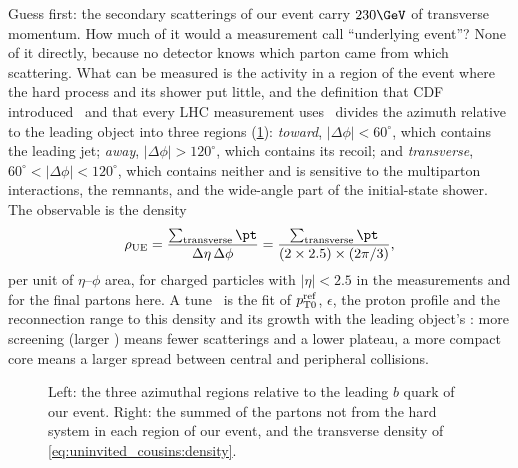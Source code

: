 Guess first: the secondary scatterings of our event carry $230\GeV$ of
transverse momentum. How much of it would a measurement call ``underlying
event''? None of it directly, because no detector knows which parton came
from which scattering. What can be measured is the activity in a region of
the event where the hard process and its shower put little, and the
definition that CDF introduced~\cite{CDF:2001onq,Field:2002vt} and that
every LHC measurement uses~\cite{ATLAS:2017blj,CMS:2017ngy} divides the
azimuth relative to the leading object into three regions
(\cref{fig:uninvited_cousins:ue_sketch}): \emph{toward}, $|\Delta\phi|<60^\circ$,
which contains the leading jet; \emph{away}, $|\Delta\phi|>120^\circ$, which
contains its recoil; and \emph{transverse}, $60^\circ<|\Delta\phi|<120^\circ$,
which contains neither and is sensitive to the multiparton interactions,
the remnants, and the wide-angle part of the initial-state shower. The
observable is the density
\begin{equation}
  \rho_{\mathrm{UE}}=\frac{\sum_{\mathrm{transverse}}\pt}{\Delta\eta\,\Delta\phi}
  =\frac{\sum_{\mathrm{transverse}}\pt}{(2\times2.5)\times(2\pi/3)},
  \label{eq:uninvited_cousins:density}
\end{equation}
per unit of $\eta$--$\phi$ area, for charged particles with $|\eta|<2.5$ in
the measurements and for the final partons here. A tune~\cite{Skands:2014pea,CMS:2019csb}
is the fit of $p_{\mathrm{T}0}^{\mathrm{ref}}$, $\epsilon$, the proton profile and
the reconnection range to this density and its growth with the leading
object's \pt: more screening (larger \ptzero) means fewer scatterings and
a lower plateau, a more compact core means a larger spread between central
and peripheral collisions.

\begin{figure}[htbp]\centering
\resizebox{\textwidth}{!}{}
\caption[The transverse-region definition of the underlying event]{Left:
the three azimuthal regions relative to the leading $b$ quark of our event.
Right: the summed \pt of the partons not from the hard system in each
region of our event, and the transverse density of
\cref{eq:uninvited_cousins:density}.}
\label{fig:uninvited_cousins:ue_sketch}
\end{figure}


